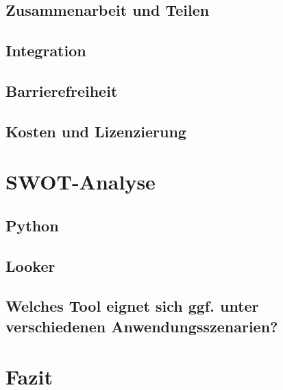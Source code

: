 \documentclass[12pt]{article}
\begin{document}
	\subsection{Zusammenarbeit und Teilen}

	\subsection{Integration}
	
	\subsection{Barrierefreiheit}

	\subsection{Kosten und Lizenzierung}

	\section{SWOT-Analyse}
	\subsection{Python}

	
	\subsection{Looker}

	\subsection{Welches Tool eignet sich ggf. unter verschiedenen Anwendungsszenarien?}

	
	\section{Fazit}
	
\end{document}
